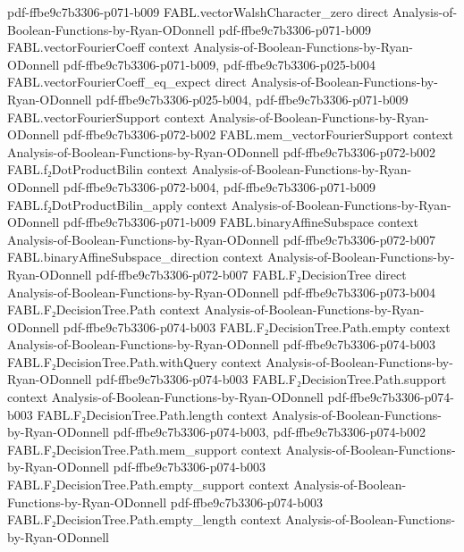 \begin{theorem}
  {pdf-ffbe9c7b3306-p071-b009}
\proofstep
  {FABL.vectorWalshCharacter_zero}
  {direct}
  {Analysis-of-Boolean-Functions-by-Ryan-ODonnell}
  {pdf-ffbe9c7b3306-p071-b009}
\proofstep
  {FABL.vectorFourierCoeff}
  {context}
  {Analysis-of-Boolean-Functions-by-Ryan-ODonnell}
  {pdf-ffbe9c7b3306-p071-b009,
    pdf-ffbe9c7b3306-p025-b004}
\proofstep
  {FABL.vectorFourierCoeff_eq_expect}
  {direct}
  {Analysis-of-Boolean-Functions-by-Ryan-ODonnell}
  {pdf-ffbe9c7b3306-p025-b004,
    pdf-ffbe9c7b3306-p071-b009}
\proofstep
  {FABL.vectorFourierSupport}
  {context}
  {Analysis-of-Boolean-Functions-by-Ryan-ODonnell}
  {pdf-ffbe9c7b3306-p072-b002}
\proofstep
  {FABL.mem_vectorFourierSupport}
  {context}
  {Analysis-of-Boolean-Functions-by-Ryan-ODonnell}
  {pdf-ffbe9c7b3306-p072-b002}
\proofstep
  {FABL.f₂DotProductBilin}
  {context}
  {Analysis-of-Boolean-Functions-by-Ryan-ODonnell}
  {pdf-ffbe9c7b3306-p072-b004,
    pdf-ffbe9c7b3306-p071-b009}
\proofstep
  {FABL.f₂DotProductBilin_apply}
  {context}
  {Analysis-of-Boolean-Functions-by-Ryan-ODonnell}
  {pdf-ffbe9c7b3306-p071-b009}
\proofstep
  {FABL.binaryAffineSubspace}
  {context}
  {Analysis-of-Boolean-Functions-by-Ryan-ODonnell}
  {pdf-ffbe9c7b3306-p072-b007}
\proofstep
  {FABL.binaryAffineSubspace_direction}
  {context}
  {Analysis-of-Boolean-Functions-by-Ryan-ODonnell}
  {pdf-ffbe9c7b3306-p072-b007}
\proofstep
  {FABL.F₂DecisionTree}
  {direct}
  {Analysis-of-Boolean-Functions-by-Ryan-ODonnell}
  {pdf-ffbe9c7b3306-p073-b004}
\proofstep
  {FABL.F₂DecisionTree.Path}
  {context}
  {Analysis-of-Boolean-Functions-by-Ryan-ODonnell}
  {pdf-ffbe9c7b3306-p074-b003}
\proofstep
  {FABL.F₂DecisionTree.Path.empty}
  {context}
  {Analysis-of-Boolean-Functions-by-Ryan-ODonnell}
  {pdf-ffbe9c7b3306-p074-b003}
\proofstep
  {FABL.F₂DecisionTree.Path.withQuery}
  {context}
  {Analysis-of-Boolean-Functions-by-Ryan-ODonnell}
  {pdf-ffbe9c7b3306-p074-b003}
\proofstep
  {FABL.F₂DecisionTree.Path.support}
  {context}
  {Analysis-of-Boolean-Functions-by-Ryan-ODonnell}
  {pdf-ffbe9c7b3306-p074-b003}
\proofstep
  {FABL.F₂DecisionTree.Path.length}
  {context}
  {Analysis-of-Boolean-Functions-by-Ryan-ODonnell}
  {pdf-ffbe9c7b3306-p074-b003,
    pdf-ffbe9c7b3306-p074-b002}
\proofstep
  {FABL.F₂DecisionTree.Path.mem_support}
  {context}
  {Analysis-of-Boolean-Functions-by-Ryan-ODonnell}
  {pdf-ffbe9c7b3306-p074-b003}
\proofstep
  {FABL.F₂DecisionTree.Path.empty_support}
  {context}
  {Analysis-of-Boolean-Functions-by-Ryan-ODonnell}
  {pdf-ffbe9c7b3306-p074-b003}
\proofstep
  {FABL.F₂DecisionTree.Path.empty_length}
  {context}
  {Analysis-of-Boolean-Functions-by-Ryan-ODonnell}

\end{theorem}
